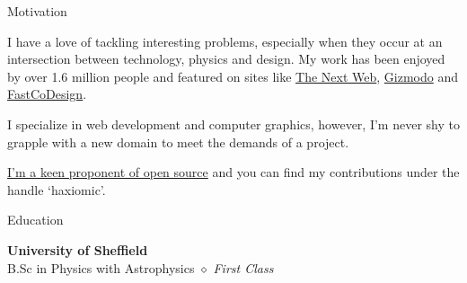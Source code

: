 \documentclass{resume} %
\begin{document}
\begin{rSection}{Motivation}

\item I have a love of tackling interesting problems, especially when they occur at an intersection between technology, physics and design. My work has been enjoyed by over 1.6 million people and featured on sites like \href{http://thenextweb.com/creativity/2015/05/15/webgl-fluid-experiment-is-a-browser-based-lsd-trip/}{The Next Web}, \href{http://www.gizmodo.co.uk/2014/11/just-try-and-stop-playing-with-this-fluid-simulator/}{Gizmodo} and \href{http://www.fastcodesign.com/3038725/this-wonderful-web-toy-turns-your-browser-into-magic-liquid}{FastCoDesign}. \item I specialize in web development and computer graphics, however, I'm never shy to grapple with a new domain to meet the demands of a project. 
\item \href{http://github.com/haxiomic}{I'm a keen proponent of open source} and you can find my contributions under the handle `haxiomic'.


\end{rSection}


\begin{rSection}{Education}

{\bf University of Sheffield} 
\\
B.Sc in Physics with Astrophysics $\diamond{}$ \textit{First Class}
\end{rSection}

\end{document}
